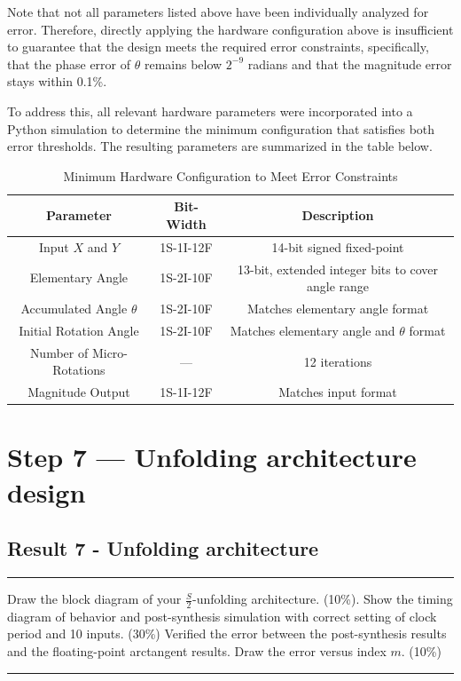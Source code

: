 \documentclass[12pt,a4paper]{report}
\begin{document}
Note that not all parameters listed above have been individually analyzed for error. Therefore, directly applying the hardware configuration above is insufficient to guarantee that the design meets the required error constraints, specifically, that the phase error of $\theta$ remains below $2^{-9}$ radians and that the magnitude error stays within 0.1\%.

\vspace{0.5cm}

To address this, all relevant hardware parameters were incorporated into a Python simulation to determine the minimum configuration that satisfies both error thresholds. The resulting parameters are summarized in the table below.

\begin{table}[h]
\centering
\begin{tabular}{|c|c|c|}
\hline
\textbf{Parameter} & \textbf{Bit-Width} & \textbf{Description} \\
\hline
Input $X$ and $Y$          & 1S-1I-12F & 14-bit signed fixed-point \\
Elementary Angle            & 1S-2I-10F & 13-bit, extended integer bits to cover angle range \\
Accumulated Angle $\theta$  & 1S-2I-10F & Matches elementary angle format \\
Initial Rotation Angle      & 1S-2I-10F & Matches elementary angle and $\theta$ format \\
Number of Micro-Rotations   & ---       & 12 iterations \\
Magnitude Output            & 1S-1I-12F & Matches input format \\
\hline
\end{tabular}
\caption{Minimum Hardware Configuration to Meet Error Constraints}
\end{table}

\newpage

\chapter{Step 7 — Unfolding architecture design}
\section{Result 7 - Unfolding architecture}

\hrule
\vspace{0.2cm}
Draw the block diagram of your $\frac{S}{2}$-unfolding architecture. (10\%). Show the timing diagram of behavior and post-synthesis simulation with correct setting of clock period and 10 inputs. (30\%) Verified the error between the post-synthesis results and the floating-point arctangent results. Draw the error versus index $m$. (10\%)
\vspace{0.2cm}
\hrule
\vspace{0.2cm}
\end{document}
